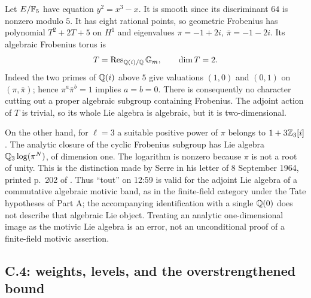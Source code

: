 \begin{example}
\label{c:finite-field-lie}
Let $E/\mathbb F_5$ have equation $y^2=x^3-x$. It is smooth since its discriminant $64$ is nonzero modulo $5$. It has eight rational points, so geometric Frobenius has polynomial $T^2+2T+5$ on $H^1$ and eigenvalues $\pi=-1+2i$, $\bar\pi=-1-2i$. Its algebraic Frobenius torus is
\[
 T=\operatorname{Res}_{\mathbb Q(i)/\mathbb Q}{\mathbb G_m},
 \qquad\dim T=2.
\]
Indeed the two primes of $\mathbb Q(i)$ above $5$ give valuations $(1,0)$ and $(0,1)$ on $(\pi,\bar\pi)$; hence $\pi^a\bar\pi^b=1$ implies $a=b=0$. There is consequently no character cutting out a proper algebraic subgroup containing Frobenius. The adjoint action of $T$ is trivial, so its whole Lie algebra is algebraic, but it is two-dimensional.

On the other hand, for $\ell=3$ a suitable positive power of $\pi$ belongs to $1+3\mathbb Z_3[i]$. The analytic closure of the cyclic Frobenius subgroup has Lie algebra $\mathbb Q_3\log(\pi^N)$, of dimension one. The logarithm is nonzero because $\pi$ is not a root of unity. This is the distinction made by Serre in his letter of 8 September 1964, printed p.~202 of \citet{c_grothendieckserre}. Thus ``tout'' on 12:59 is valid for the adjoint Lie algebra of a commutative algebraic motivic band, as in the finite-field category under the Tate hypotheses of Part A; the accompanying identification with a single $\mathbb Q(0)$ does not describe that algebraic Lie object. Treating an analytic one-dimensional image as the motivic Lie algebra is an error, not an unconditional proof of a finite-field motivic assertion.
\end{example}

\subsection{C.4: weights, levels, and the overstrengthened bound}

